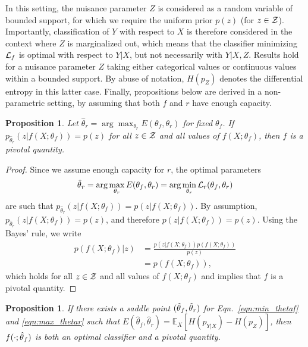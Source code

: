 \documentclass[twocolumn,superscriptaddress,aps]{revtex4-1}
\theoremstyle{plain}
\newtheorem{proposition}[theorem]{Proposition}
\begin{document}
In this setting, the nuisance parameter $Z$ is considered as a random variable
of bounded support, for which we require the uniform prior $p(z)$ (for $z \in
{\cal Z}$). Importantly, classification of $Y$ with respect to $X$ is therefore
considered in the context where $Z$ is marginalized out, which means that the
classifier minimizing ${\cal L}_f$ is optimal with respect to $Y|X$, but not
necessarily with $Y|X,Z$. Results hold for a nuisance parameter $Z$ taking
either categorical values or continuous values within a bounded support. By
abuse of notation, $H(p_Z)$ denotes the differential entropy in this latter
case. Finally, propositions below are derived in a non-parametric setting, by
assuming that both $f$ and $r$ have enough capacity.

\begin{proposition}\label{prop:1}
Let $\hat\theta_r = \arg \max_{\theta_r} E(\theta_f,
\theta_r)$ for fixed $\theta_f$. If $p_{\hat\theta_r}(z|f(X;\theta_f)) = p(z)$
for all $z \in {\cal Z}$ and all values of $f(X;\theta_f)$, then $f$ is a pivotal quantity.
\end{proposition}

\begin{proof}
Since we assume enough capacity for $r$, the optimal parameters $$\smash{\hat\theta}_r =
\arg \max_{\theta_r} E(\theta_f, \theta_r) = \arg \min_{\theta_r} {\cal L}_r(\theta_f,
\theta_r)$$ are such that $p_{\hat\theta_r}(z|f(X;\theta_f)) = p(z|f(X;\theta_f))$.
By assumption, $p_{\hat\theta_r}(z|f(X;\theta_f)) = p(z)$,
and therefore $p(z|f(X;\theta_f)) = p(z)$.
Using the Bayes' rule, we write
\begin{align*}
    p(f(X;\theta_f)|z) &= \frac{ p(z|f(X;\theta_f)) p(f(X;\theta_f)) } { p(z)}\\
                       &= p(f(X;\theta_f)),
\end{align*}
which holds for all $z \in {\cal Z}$ and all values of $f(X;\theta_f)$ and implies that $f$ is a pivotal quantity.
\end{proof}

\begin{proposition}\label{prop:2}
If there exists a saddle point $(\smash{\hat\theta}_f, \smash{\hat\theta}_r)$
for Eqn.~\ref{eqn:min_thetaf} and \ref{eqn:max_thetar} such that
$E(\hat\theta_f, \hat\theta_r) = \mathbb{E}_{X} [H(p_{Y|X}) - H(p_Z)]$, then
$f(\cdot;\smash{\hat\theta}_f)$ is both an optimal classifier and a pivotal
quantity.
\end{proposition}
\end{document}
